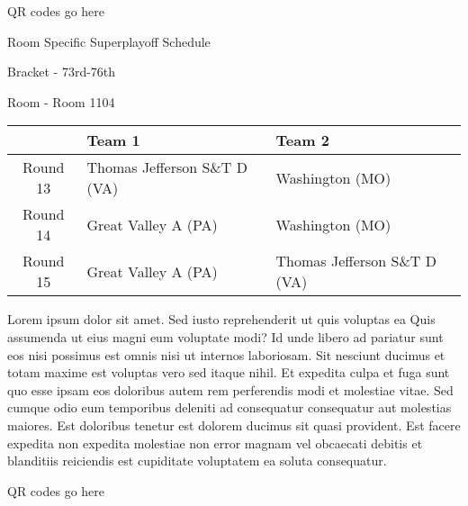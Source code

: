 \documentclass{article}%
\begin{document}
\vspace*{140pt}%
\begin{center}%
\begin{Huge}%
QR codes go here%
\end{Huge}%
\end{center}%
\newpage%
\begin{center}%
\begin{Huge}%
Room Specific Superplayoff Schedule%
\end{Huge}%
\vspace*{8pt}%
\linebreak%
\begin{Large}%
Bracket {-} 73rd{-}76th%
\end{Large}%
\vspace*{8pt}%
\linebreak%
\vspace*{8pt}%
\begin{Large}%
Room {-} Room 1104%
\end{Large}%
\end{center}%
%
\begin{tabularx}{\textwidth}{|c|Y|Y|}%
\hline%
&Team 1&Team 2\\%
\hline%
Round 13&Thomas Jefferson S\&T D (VA)&Washington (MO)\\%
Round 14&Great Valley A (PA)&Washington (MO)\\%
Round 15&Great Valley A (PA)&Thomas Jefferson S\&T D (VA)\\%
\hline%
\end{tabularx}%
\vspace*{8pt}%
\newline%
Lorem ipsum dolor sit amet. Sed iusto reprehenderit ut quis voluptas ea Quis assumenda ut eius magni eum voluptate modi? Id unde libero ad pariatur sunt eos nisi possimus est omnis nisi ut internos laboriosam. Sit nesciunt ducimus et totam maxime est voluptas vero sed itaque nihil. Et expedita culpa et fuga sunt quo esse ipsam eos doloribus autem rem perferendis modi et molestiae vitae.\newline%
\newline%
Sed cumque odio eum temporibus deleniti ad consequatur consequatur aut molestias maiores. Est doloribus tenetur est dolorem ducimus sit quasi provident. Est facere expedita non expedita molestiae non error magnam vel obcaecati debitis et blanditiis reiciendis est cupiditate voluptatem ea soluta consequatur.%
\vspace*{140pt}%
\begin{center}%
\begin{Huge}%
QR codes go here%
\end{Huge}%
\end{center}%
\end{document}
